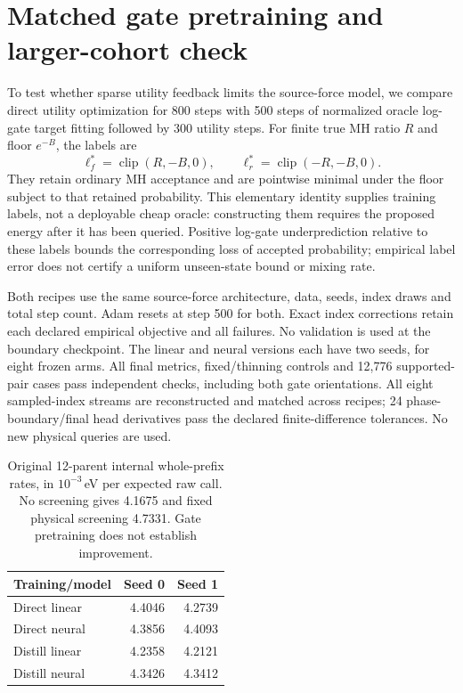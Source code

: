 \section{Matched gate pretraining and larger-cohort check}
\label{app:gate-distillation-transfer}

To test whether sparse utility feedback limits the source-force model, we
compare direct utility optimization for 800 steps with 500 steps of normalized
oracle log-gate target fitting followed by 300 utility steps. For finite true
MH ratio $R$ and floor $e^{-B}$, the labels are
\begin{equation}
 \ell_f^*=\operatorname{clip}(R,-B,0),\qquad
 \ell_r^*=\operatorname{clip}(-R,-B,0).
\end{equation}
They retain ordinary MH acceptance and are pointwise minimal under the floor
subject to that retained probability. This elementary identity supplies training
labels, not a deployable cheap oracle: constructing them requires the proposed
energy after it has been queried. Positive log-gate underprediction relative to
these labels bounds the corresponding loss of accepted probability; empirical
label error does not certify a uniform unseen-state bound or mixing rate.

Both recipes use the same source-force architecture, data, seeds, index draws
and total step count. Adam resets at step 500 for both. Exact index corrections
retain each declared empirical objective and all failures. No validation is used
at the boundary checkpoint. The linear and neural versions each have two seeds,
for eight frozen arms. All final metrics, fixed/thinning controls and 12,776
supported-pair cases pass independent checks, including both gate orientations.
All eight sampled-index streams are reconstructed and matched across recipes;
24 phase-boundary/final head derivatives pass the declared finite-difference
tolerances. No new physical queries are used.

\begin{table}[h]
\centering\small
\begin{tabular}{lrr}
\toprule
Training/model & Seed 0 & Seed 1 \\
\midrule
Direct linear & 4.4046 & 4.2739 \\
Direct neural & 4.3856 & 4.4093 \\
Distill linear & 4.2358 & 4.2121 \\
Distill neural & 4.3426 & 4.3412 \\
\bottomrule
\end{tabular}
\caption{Original 12-parent internal whole-prefix rates, in
$10^{-3}$\,eV per expected raw call. No screening gives 4.1675 and fixed physical
screening 4.7331. Gate pretraining does not establish improvement.}
\end{table}

